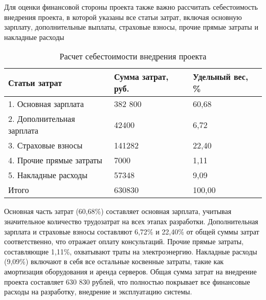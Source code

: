 \documentclass{report}
\begin{document}
Для оценки финансовой стороны проекта также важно рассчитать себестоимость внедрения проекта, в которой указаны все статьи затрат, включая основную зарплату, дополнительные выплаты, страховые взносы, прочие прямые затраты и накладные расходы %

\renewcommand{\arraystretch}{1}
\begin{table}[H]
    \centering   %
    \caption{Расчет себестоимости внедрения проекта}    %
    \begin{tabular}{|m{6.9cm}|m{4.4cm}|m{4cm}|}        %
    \hline   %
    \centering\arraybackslash Статьи затрат & \centering\arraybackslash Сумма затрат, руб. & \centering\arraybackslash Удельный вес, \% \\ \hline
    1. Основная зарплата & 382 800 & 60,68 \\ \hline
    2. Дополнительная зарплата & 42400 & 6,72 \\ \hline
    3. Страховые взносы & 141282 & 22,40 \\ \hline
    4. Прочие прямые затраты & 7000 & 1,11 \\ \hline
    5. Накладные расходы & 57348 & 9,09 \\ \hline
    Итого & 630830 & 100,00 \\ \hline
    \end{tabular}
    \label{table:table23}
\end{table}

Основная часть затрат (60,68\%) составляет основная зарплата, учитывая значительное количество трудозатрат на всех этапах разработки. Дополнительная зарплата и страховые взносы составляют 6,72\% и 22,40\% от общей суммы затрат соответственно, что отражает оплату консультаций. Прочие прямые затраты, составляющие 1,11\%, охватывают траты на электроэнергию. Накладные расходы (9,09\%) включают в себя все остальные косвенные затраты, такие как амортизация оборудования и аренда серверов. Общая сумма затрат на внедрение проекта составляет 630 830 рублей, что полностью покрывает все финансовые расходы на разработку, внедрение и эксплуатацию системы.
\end{document}
